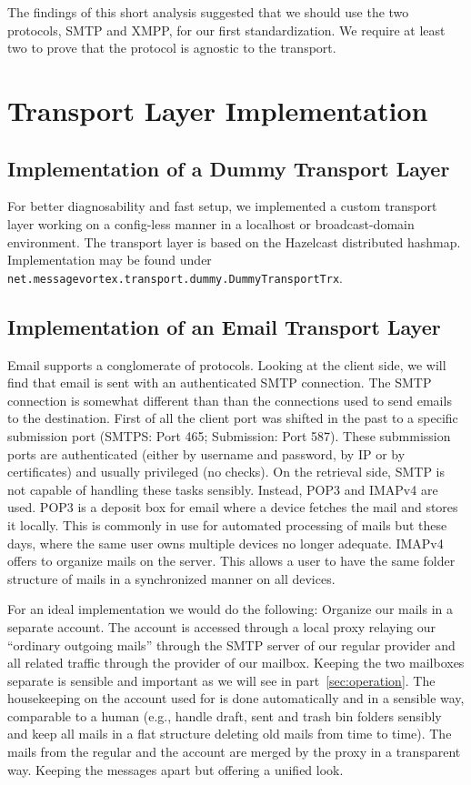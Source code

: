 The findings of this short analysis suggested that we should use the two protocols, SMTP and XMPP, for our first standardization. We require at least two to prove that the protocol is agnostic to the transport.

\chapter{Transport Layer Implementation}
\section{Implementation of a Dummy Transport Layer}
For better diagnosability and fast setup, we implemented a custom transport layer working on a config-less manner in a localhost or broadcast-domain environment. The transport layer is based on the Hazelcast distributed hashmap. Implementation may be found under \lstinline[columns=fixed,basicstyle=\normalsize]{net.messagevortex.transport.dummy.DummyTransportTrx}. 

\section{Implementation of an Email Transport Layer}
Email supports a conglomerate of protocols. Looking at the client side, we will find that email is sent with an authenticated SMTP connection. The SMTP connection is somewhat different than than the connections used to send emails to the destination. First of all the client port was shifted in the past to a specific submission port (SMTPS: Port 465; Submission: Port 587). These submmission ports are authenticated (either by username and password, by IP or by certificates) and usually privileged (no  checks). On the retrieval side, SMTP is not capable of handling these tasks sensibly. Instead, POP3 and IMAPv4 are used. POP3 is a deposit box for email where a device fetches the mail and stores it locally. This is commonly in use for automated processing of mails but these days, where the same user owns multiple devices no longer adequate. IMAPv4 offers to organize mails on the server. This allows a user to have the same folder structure of mails in a synchronized manner on all devices.

For an ideal implementation we would do the following: Organize our \MessageVortex{} mails in a separate account. The account is accessed through a local proxy relaying our ``ordinary outgoing mails'' through the SMTP server of our regular provider and all \MessageVortex{} related traffic through the provider of our \MessageVortex{} mailbox. Keeping the two mailboxes separate is sensible and important as we will see in part~\ref{sec:operation}. The housekeeping on the account used for \MessageVortex{} is done automatically and in a sensible way, comparable to a human (e.g., handle draft, sent and trash bin folders sensibly and keep all mails in a flat structure deleting old mails from time to time). The mails from the regular and the \MessageVortex{} account are merged by the proxy in a transparent way. Keeping the messages apart but offering a unified look.

